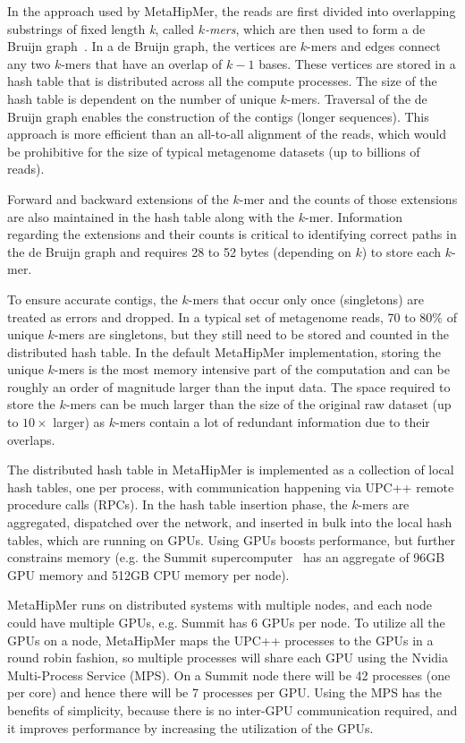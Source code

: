 In the approach used by MetaHipMer, the reads are first divided into overlapping
substrings of fixed length {\it k}, called {\it $k$-mers}, which are then used
to form a de Bruijn graph~\cite{CompeauPeTe11}. In a de Bruijn graph, the
vertices are $k$-mers and edges connect any two $k$-mers that have an overlap of
$k-1$ bases. These vertices are stored in a hash table that is distributed
across all the compute processes.  The size of the hash table is dependent on
the number of unique $k$-mers.  Traversal of the de Bruijn graph enables the
construction of the contigs (longer sequences).  This approach is more efficient
than an all-to-all alignment of the reads, which would be prohibitive for the
size of typical metagenome datasets (up to billions of reads).

Forward and backward extensions of the $k$-mer and the counts of those
extensions are also maintained in the hash table along with the $k$-mer.
Information regarding the extensions and their counts is critical to identifying
correct paths in the de Bruijn graph and requires 28 to 52 bytes (depending on
$k$) to store each $k$-mer.

To ensure accurate contigs, the $k$-mers that occur only once (singletons) are
treated as errors and dropped. In a typical set of metagenome reads, 70 to 80\%
of unique $k$-mers are singletons, but they still need to be stored and counted
in the distributed hash table. In the default MetaHipMer implementation, storing
the unique $k$-mers is the most memory intensive part of the computation and can
be roughly an order of magnitude larger than the input data.  The space required
to store the $k$-mers can be much larger than the size of the original raw
dataset (up to $10\times$ larger) as $k$-mers contain a lot of redundant
information due to their overlaps.

The distributed hash table in MetaHipMer is implemented as a collection of local
hash tables, one per process, with communication happening via UPC++ remote
procedure calls (RPCs). In the hash table insertion phase, the $k$-mers are
aggregated, dispatched over the network, and inserted in bulk into the local
hash tables, which are running on GPUs. Using GPUs boosts performance, but
further constrains memory (e.g. the Summit supercomputer~\cite{VazhkudaiDBG18}
has an aggregate of 96GB GPU memory and 512GB CPU memory per node).

MetaHipMer runs on distributed systems with multiple nodes, and each node could
have multiple GPUs, e.g. Summit has 6 GPUs per node. To utilize all the GPUs on
a node, MetaHipMer maps the UPC++ processes to the GPUs in a round robin
fashion, so multiple processes will share each GPU using the Nvidia
Multi-Process Service (MPS). On a Summit node there will be 42 processes (one
per core) and hence there will be 7 processes per GPU\@. Using the MPS has the
benefits of simplicity, because there is no inter-GPU communication required,
and it improves performance by increasing the utilization of the GPUs.

